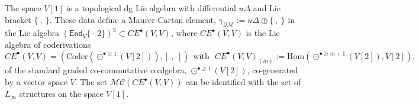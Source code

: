\documentclass{amsart}
\theoremstyle{plain}
\theoremstyle{definition}
\begin{document}
The space $V[1]$ is a topological dg Lie algebra with differential ${u} \Delta$ and
Lie bracket $\{\ ,\ \}$. These data define a Maurer-Cartan element, ${\gamma}_{{{\mathcal Q}}{{\mathcal M}}}:={u}\Delta \oplus
 \{\ ,\ \}$ in the Lie algebra $({{\mathsf E}} \mathsf n \mathsf d_V\{-2\})^{{\mathbb S}}\subset CE^{\bullet}(V,V)$, where $CE^{\bullet}(V,V)$ is the Lie algebra of  coderivations
 $$
 CE^{\bullet}(V,V)=\left(\mbox{Coder}(\odot^{{\bullet}\geq 1}(V[2])), [\ ,\ ] \right)\ \ \mathrm{with}\ \ \ CE^{\bullet}(V,V)_{(m)}:={{\mathrm H\mathrm o\mathrm m}}(\odot^{{\bullet}\geq m+1}(V[2]), V[2]),
 $$
of the standard graded co-commutative coalgebra, $\odot^{{\bullet}\geq 1}(V[2])$, co-generated by a vector space $V$. The set ${{\mathcal M}}{{\mathcal C}}(CE^{\bullet}(V,V))$ can be identified with the set of
 $L_\infty$ structures 
 on the space $V[1]$.
 

{\smallskip}
\end{document}
